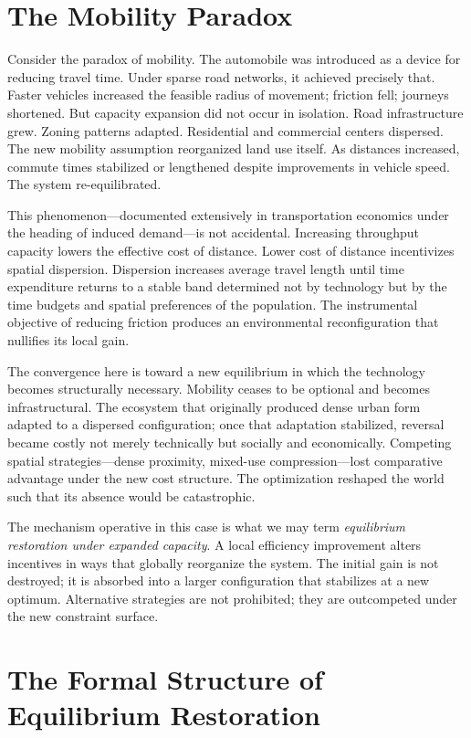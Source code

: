 \documentclass[12pt, oneside]{book}
\theoremstyle{plain}
\theoremstyle{definition}
\theoremstyle{remark}
\theoremstyle{definition}
\begin{document}
\section{The Mobility Paradox}

Consider the paradox of mobility. The automobile was introduced as a device for
reducing travel time. Under sparse road networks, it achieved precisely that. Faster
vehicles increased the feasible radius of movement; friction fell; journeys shortened.
But capacity expansion did not occur in isolation. Road infrastructure grew. Zoning
patterns adapted. Residential and commercial centers dispersed. The new mobility
assumption reorganized land use itself. As distances increased, commute times
stabilized or lengthened despite improvements in vehicle speed. The system
re-equilibrated.

This phenomenon---documented extensively in transportation economics under the
heading of induced demand---is not accidental. Increasing throughput capacity lowers
the effective cost of distance. Lower cost of distance incentivizes spatial dispersion.
Dispersion increases average travel length until time expenditure returns to a stable
band determined not by technology but by the time budgets and spatial preferences of
the population. The instrumental objective of reducing friction produces an
environmental reconfiguration that nullifies its local gain.

The convergence here is toward a new equilibrium in which the technology becomes
structurally necessary. Mobility ceases to be optional and becomes infrastructural.
The ecosystem that originally produced dense urban form adapted to a dispersed
configuration; once that adaptation stabilized, reversal became costly not merely
technically but socially and economically. Competing spatial strategies---dense
proximity, mixed-use compression---lost comparative advantage under the new cost
structure. The optimization reshaped the world such that its absence would be
catastrophic.

The mechanism operative in this case is what we may term \emph{equilibrium
restoration under expanded capacity}. A local efficiency improvement alters incentives
in ways that globally reorganize the system. The initial gain is not destroyed; it is
absorbed into a larger configuration that stabilizes at a new optimum. Alternative
strategies are not prohibited; they are outcompeted under the new constraint surface.

\section{The Formal Structure of Equilibrium Restoration}
\end{document}
